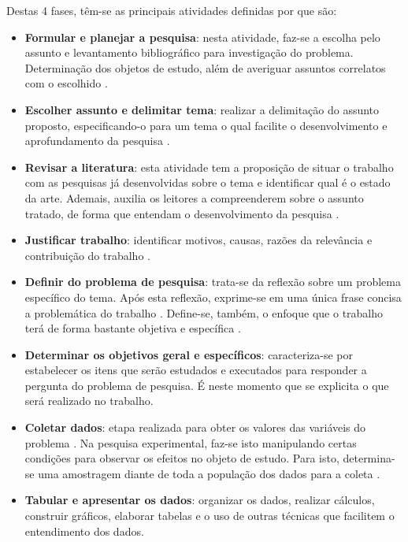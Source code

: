 Destas 4 fases, têm-se as principais atividades definidas por  que são:

\begin{itemize}
  \item \textbf{Formular e planejar a pesquisa}: nesta atividade, faz-se a escolha pelo assunto e levantamento bibliográfico para investigação do problema. Determinação dos objetos de estudo, além de averiguar assuntos correlatos com o escolhido \cite{prodanov_metodologia_2013}.
  \item \textbf{Escolher assunto e delimitar tema}: realizar a delimitação do assunto proposto, especificando-o para um tema o qual facilite o desenvolvimento e aprofundamento da pesquisa \cite{prodanov_metodologia_2013}.
  \item \textbf{Revisar a literatura}: esta atividade tem a proposição de situar o trabalho com as pesquisas já desenvolvidas sobre o tema e identificar qual é o estado da arte. Ademais, auxilia os leitores a compreenderem sobre o assunto tratado, de forma que entendam o desenvolvimento da pesquisa \cite{prodanov_metodologia_2013}.
  \item \textbf{Justificar trabalho}: identificar motivos, causas, razões da relevância e contribuição do trabalho \cite{prodanov_metodologia_2013}.
  \item \textbf{Definir do problema de pesquisa}: trata-se da reflexão sobre um problema específico do tema. Após esta reflexão, exprime-se em uma única frase concisa a problemática do trabalho \cite{prodanov_metodologia_2013}. Define-se, também, o enfoque que o trabalho terá de forma bastante objetiva e específica \cite{gil_como_2002}.
  \item \textbf{Determinar os objetivos geral e específicos}: caracteriza-se por estabelecer os itens que serão estudados e executados para responder a pergunta do problema de pesquisa. É neste momento que se explicita o que será realizado no trabalho.
  \item \textbf{Coletar dados}: etapa realizada para obter os valores das variáveis do problema \cite{prodanov_metodologia_2013}. Na pesquisa experimental, faz-se isto manipulando certas condições para observar os efeitos no objeto de estudo. Para isto, determina-se uma amostragem diante de toda a população dos dados para a coleta \cite{gil_como_2002}.
  \item \textbf{Tabular e apresentar os dados}: organizar os dados, realizar cálculos, construir gráficos, elaborar tabelas e o uso de outras técnicas que facilitem o entendimento dos dados.

\end{itemize}
